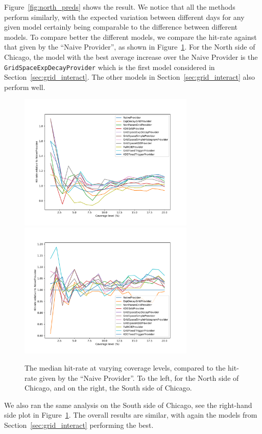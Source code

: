 \documentclass[twoside,a4paper]{article}
\theoremstyle{plain}
\theoremstyle{definition}
\begin{document}
Figure~\ref{fig:north_preds} shows the result.  We notice that all the methods perform
similarly, with the expected variation between different days for any given model certainly
being comparable to the difference between different models.  To compare better the different
models, we compare the hit-rate against that given by the ``Naive Provider'', as shown in
Figure~\ref{fig:north_preds_normed}.  For the North side of Chicago, the model with the best
average increase over the Naive Provider is the \texttt{GridSpaceExpDecayProvider}
which is the first model considered in Section~\ref{sec:grid_interact}.  The other models in
Section~\ref{sec:grid_interact} also perform well.

\begin{figure}
  \includegraphics[width=3.3in]{../notebooks/all_north_preds_normed.pdf}
  \includegraphics[width=3.3in]{../notebooks/all_south_preds_normed.pdf}
  \caption{The median hit-rate at varying coverage levels, compared to the hit-rate
  given by the ``Naive Provider''.  To the left, for the North side of Chicago, and on
  the right, the South side of Chicago.}
  \label{fig:north_preds_normed}
\end{figure}

We also ran the same analysis on the South side of Chicago, see the right-hand side plot
in Figure~\ref{fig:north_preds_normed}.  The overall results are similar, with again
the models from Section~\ref{sec:grid_interact} performing the best.
\end{document}
